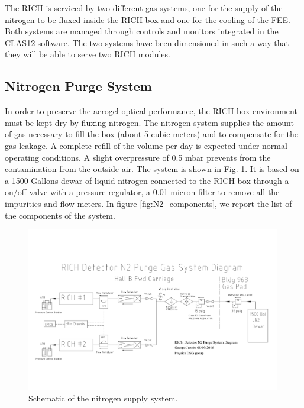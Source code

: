 \documentclass[12pt]{article}
\begin{document}
The RICH is serviced by two different gas systems, one for the supply of the nitrogen to be fluxed inside the RICH box and one for the cooling of the FEE.
Both systems are managed through controls and monitors integrated in the CLAS12 software.
The two systems have been dimensioned in such a way that they will be able to serve two RICH modules.


\subsection{Nitrogen Purge System}

In order to preserve the aerogel optical performance, the RICH box environment must be kept dry by fluxing nitrogen.
The nitrogen system supplies the amount of gas necessary to fill the box (about 5 cubic meters) and to compensate for the gas leakage.
A complete refill of the volume per day is expected under normal operating conditions.
A slight overpressure of 0.5 mbar prevents from the contamination from the outside air.
The system is shown in Fig. \ref{fig:N2_drawing}.
It is based on a 1500 Gallons dewar of liquid nitrogen connected to the RICH box through a on/off valve with a pressure regulator, a 0.01 micron filter to remove all the impurities and flow-meters.
In figure \ref{fig:N2_components}, we report the list of the components of the system.

\begin{figure}[h!]
\center
\includegraphics[width=0.99\textwidth]{pics/N2_drawing.jpg}
\caption{ \label{fig:N2_drawing} Schematic of the nitrogen supply system.}
\end{figure}
\end{document}
